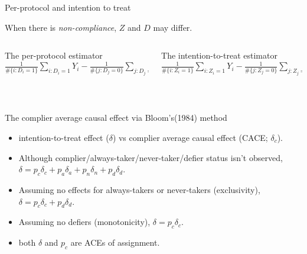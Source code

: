 \begin{frame}{Per-protocol and intention to treat}

When there is \textit{non-compliance}, $Z$ and $D$ may differ.  \pause  

  \begin{columns}
    \begin{Column}
  { The per-protocol estimator} \\      
$\frac{1}{\# \{i: D_i = 1\}} \sum_{i:D_i=1} Y_i - \frac{1}{\# \{j: D_j = 0\}} \sum_{j:D_j=0} Y_j$
\bigskip

\vspace{.5\textheight} 
\mbox{ }

    \end{Column}
    \begin{Column}
  { The intention-to-treat estimator} \\      
$\frac{1}{\# \{i: Z_i = 1\}} \sum_{i:Z_i=1} Y_i - \frac{1}{\# \{j: Z_j = 0\}} \sum_{j:Z_j=0} Y_j$
\bigskip


\vspace{.5\textheight} 
\mbox{ }
    \end{Column}

  \end{columns}
\end{frame}

\begin{frame}{The complier average causal effect via Bloom's(1984) method}
  \begin{itemize}
  \item intention-to-treat effect ($\delta$) vs
    complier average causal effect (CACE; $\delta_{c}$).
 \item Although complier/always-taker/never-taker/defier status isn't
   observed, $\delta = p_{c}\delta_{c} + p_{a} \delta_{a} + p_{n} \delta_{n}
   + p_{d} \delta_{d}$.
  \item Assuming no effects for always-takers or never-takers
    (exclusivity), $\delta = p_{c} \delta_{c} + p_{d} \delta_{d} $.
  \item Assuming no defiers (monotonicity), $\delta = p_{c}
    \delta_{c}$. 
  \item both $\delta$ and $p_{c}$ are ACEs of assignment.
 \end{itemize}

\end{frame}

